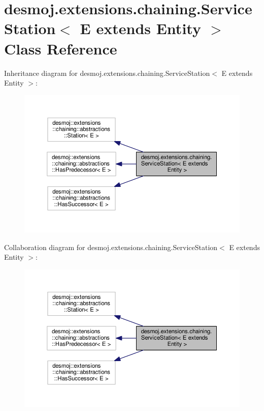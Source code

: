 \section{desmoj.\-extensions.\-chaining.\-Service\-Station$<$ E extends Entity $>$ Class Reference}
\label{classdesmoj_1_1extensions_1_1chaining_1_1_service_station_3_01_e_01extends_01_entity_01_4}


Inheritance diagram for desmoj.\-extensions.\-chaining.\-Service\-Station$<$ E extends Entity $>$\-:
\nopagebreak
\begin{figure}[H]
\begin{center}
\leavevmode
\includegraphics[width=350pt]{classdesmoj_1_1extensions_1_1chaining_1_1_service_station_3_01_e_01extends_01_entity_01_4__inherit__graph}
\end{center}
\end{figure}


Collaboration diagram for desmoj.\-extensions.\-chaining.\-Service\-Station$<$ E extends Entity $>$\-:
\nopagebreak
\begin{figure}[H]
\begin{center}
\leavevmode
\includegraphics[width=350pt]{classdesmoj_1_1extensions_1_1chaining_1_1_service_station_3_01_e_01extends_01_entity_01_4__coll__graph}
\end{center}
\end{figure}
